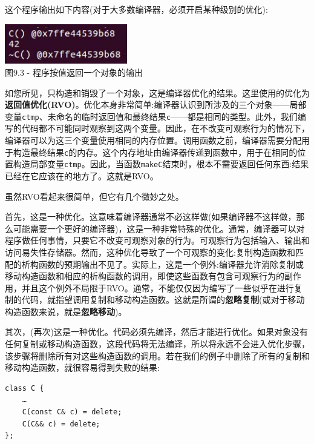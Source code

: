 这个程序输出如下内容(对于大多数编译器，必须开启某种级别的优化):

\begin{center}
\includegraphics[width=0.4\textwidth]{content/3/chapter9/images/3.jpg}\\
图9.3 - 程序按值返回一个对象的输出
\end{center}

如您所见，只构造和销毁了一个对象，这是编译器优化的结果。这里使用的优化为\textbf{返回值优化(RVO)}。优化本身非常简单:编译器认识到所涉及的三个对象——局部变量\texttt{ctmp}、未命名的临时返回值和最终结果\texttt{c}——都是相同的类型。此外，我们编写的代码都不可能同时观察到这两个变量。因此，在不改变可观察行为的情况下，编译器可以为这三个变量使用相同的内存位置。调用函数之前，编译器需要分配用于构造最终结果\texttt{c}的内存。这个内存地址由编译器传递到函数中，用于在相同的位置构造局部变量\texttt{ctmp}。因此，当函数\texttt{makeC}结束时，根本不需要返回任何东西:结果已经在它应该在的地方了。这就是RVO。

虽然RVO看起来很简单，但它有几个微妙之处。 

首先，这是一种优化。这意味着编译器通常不必这样做(如果编译器不这样做，那么可能需要一个更好的编译器)，这是一种非常特殊的优化。通常，编译器可以对程序做任何事情，只要它不改变可观察对象的行为。可观察行为包括输入、输出和访问易失性存储器。然而，这种优化导致了一个可观察的变化:复制构造函数和匹配的析构函数的预期输出不见了。实际上，这是一个例外:编译器允许消除复制或移动构造函数和相应的析构函数的调用，即使这些函数有包含可观察行为的副作用，并且这个例外不局限于RVO。通常，不能仅仅因为编写了一些似乎在进行复制的代码，就指望调用复制和移动构造函数。这就是所谓的\textbf{忽略复制}(或对于移动构造函数来说，就是\textbf{忽略移动})。

其次，(再次)这是一种优化。代码必须先编译，然后才能进行优化。如果对象没有任何复制或移动构造函数，这段代码将无法编译，所以将永远不会进入优化步骤，该步骤将删除所有对这些构造函数的调用。若在我们的例子中删除了所有的复制和移动构造函数，就很容易得到失败的结果:

\begin{lstlisting}[style=styleCXX]
class C {
	…
	C(const C& c) = delete;
	C(C&& c) = delete;
}; 
\end{lstlisting}

